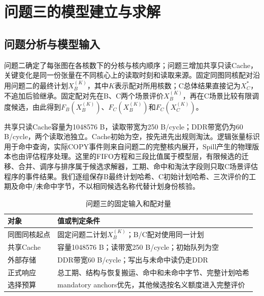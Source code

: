 \section{问题三的模型建立与求解}
\label{sec:question-three}

\subsection{问题分析与模型输入}
问题二确定了每张图在各核数下的分核与核内顺序；问题三增加共享只读Cache，关键变化是同一份张量在不同核心上的读取时刻和读取来源。固定同图同核配对沿用问题二的最终计划$X_B^{(K)}$，其中$K$表示配对所用核数；C总体结果直接记为$X_C^*$，不追加后验继承。固定配对先在B、C两个场景评价$X_B^{(K)}$，再在C场景比较有限调度候选，由此得到$F_B(X_B^{(K)})$、$F_C(X_B^{(K)})$和$F_C(X_C^{(K)})$。

共享只读Cache容量为1048576 B，读取带宽为250 B/cycle；DDR带宽仍为60 B/cycle，两个读取池独立。Cache初始为空，按先进先出规则淘汰。逻辑张量标识用于命中查询，实际COPY事件则来自问题二的完整核内展开，Spill产生的物理版本也由评估程序处理。这里的FIFO方程和三段比值属于模型层，有限候选的迁移、合并、调序与排序属于候选求解器，工期、命中和淘汰字段则只取C场景评估程序的事件结果。我们逐组保存B最终计划哈希、C初始计划哈希、三次评价的工期及命中/未命中字节，不以相同候选名称代替计划身份核验。
\begin{table}[H]\centering\caption{问题三的固定输入和配对量}\label{tab:c-inputs}
\begin{tabularx}{\linewidth}{lY}\toprule
对象 & 值或判定条件\\\midrule
同图同核起点 & 固定问题二计划$X_B^{(K)}$；B/C配对使用同一计划\\
共享Cache & 容量1048576 B；读带宽250 B/cycle；初始队列为空\\
外部存储 & DDR带宽60 B/cycle；写出与未命中读仍走DDR\\
正式响应 & 总工期、结构与恢复搬运、命中和未命中字节、完整计划哈希\\
选择预算 & mandatory anchors优先，其他候选按名义额度进入完整评价\\\bottomrule
\end{tabularx}\end{table}

